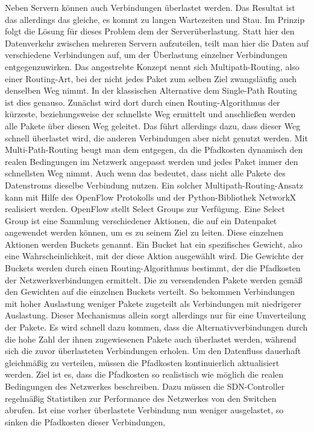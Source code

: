 Neben Servern können auch Verbindungen überlastet werden. Das Resultat ist das allerdings das gleiche, es kommt zu langen Wartezeiten und Stau. Im Prinzip folgt die Lösung für dieses Problem dem der Serverüberlastung. 
Statt hier den Datenverkehr zwischen mehreren Servern aufzuteilen, teilt man hier die Daten auf verschiedene Verbindungen auf, um der Überlastung einzelner Verbindungen entgegenzuwirken. 
Das angestrebte Konzept nennt sich Multipath-Routing, also einer Routing-Art, bei der nicht jedes Paket zum selben Ziel zwangsläufig auch denselben Weg nimmt. 
In der klassischen Alternative dem Single-Path Routing ist dies genauso. Zunächst wird dort durch einen Routing-Algorithmus der kürzeste, 
beziehungsweise der schnellste Weg ermittelt und anschließen werden alle Pakete über diesen Weg geleitet. Das führt allerdings dazu, dass dieser Weg schnell überlastet wird, die anderen Verbindungen aber nicht genutzt werden. 
Mit Multi-Path-Routing beugt man dem entgegen, da die Pfadkosten dynamisch den realen Bedingungen im Netzwerk angepasst werden und jedes Paket immer den schnellsten Weg nimmt. Auch wenn das bedeutet, 
dass nicht alle Pakete des Datenstroms dieselbe Verbindung nutzen. Ein solcher Multipath-Routing-Ansatz kann mit Hilfe des OpenFlow Protokolls und der Python-Bibliothek NetworkX realisiert werden. 
OpenFlow stellt Select Groups zur Verfügung. Eine Select Group ist eine Sammlung verschiedener Aktionen, die auf ein Datenpaket angewendet werden können, um es zu seinem Ziel zu leiten. 
Diese einzelnen Aktionen werden Buckets genannt. Ein Bucket hat ein spezifisches Gewicht, also eine Wahrscheinlichkeit, mit der diese Aktion ausgewählt wird. 
Die Gewichte der Buckets werden durch einen Routing-Algorithmus bestimmt, der die Pfadkosten der Netzwerkverbindungen ermittelt. Die zu versendenden Pakete werden gemäß den Gewichten auf die einzelnen Buckets verteilt. 
So bekommen Verbindungen mit hoher Auslastung weniger Pakete zugeteilt als Verbindungen mit niedrigerer Auslastung. Dieser Mechanismus allein sorgt allerdings nur für eine Umverteilung der Pakete. 
Es wird schnell dazu kommen, dass die Alternativverbindungen durch die hohe Zahl der ihnen zugewiesenen Pakete auch überlastet werden, während sich die zuvor überlasteten Verbindungen erholen. 
Um den Datenfluss dauerhaft gleichmäßig zu verteilen, müssen die Pfadkosten kontinuierlich aktualisiert werden. Ziel ist es, dass die Pfadkosten so realistisch wie möglich die realen Bedingungen des Netzwerkes beschreiben. 
Dazu müssen die \ac{SDN}-Controller regelmäßig Statistiken zur Performance des Netzwerkes von den Switchen abrufen. Ist eine vorher überlastete Verbindung nun weniger ausgelastet, so sinken die Pfadkosten dieser Verbindungen, 
